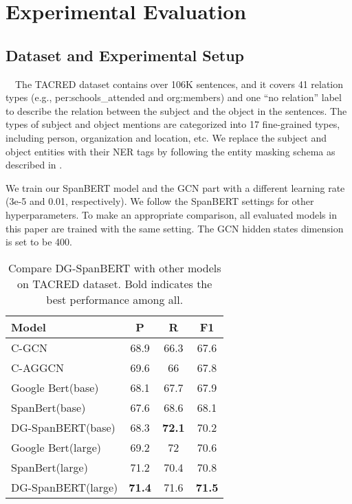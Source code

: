 \documentclass{article}
\begin{document}
\section{Experimental Evaluation}
\subsection{Dataset and Experimental Setup}
\
\
The TACRED dataset \cite{zhang2017position} contains over 106K sentences, and it covers 41 relation types (e.g., per:schools\_attended and org:members) and one ``no relation'' label to describe the relation between the subject and the object in the sentences. The types of subject and object mentions are categorized into 17 fine-grained types, including person, organization and location, etc. We replace the subject and object entities with their NER tags by following the entity masking schema as described in \cite{zhang2017position}.

We train our SpanBERT model and the GCN part with a different learning rate (3e-5 and 0.01, respectively). We follow the SpanBERT settings for other hyperparameters.  To make an appropriate comparison, all evaluated models in this paper are trained with the same setting. The GCN hidden states dimension is set to be 400.

\begin{table}[ht]
	\centering
\begin{tabular}{lccc}
	\hline
    \textbf{Model} & \textbf{P} & \textbf{R} & \textbf{F1}   \\
	\hline
	C-GCN & 68.9& 66.3& 67.6\\
	C-AGGCN & 69.6& 66 & 67.8\\
	\hline
	Google Bert(base) & 68.1 & 67.7 & 67.9 \\
    SpanBert(base) & 67.6  & 68.6 & 68.1\\
    DG-SpanBERT(base) & 68.3 & \textbf{72.1} & 70.2\\
    \hline
    Google Bert(large) &69.2 & 72 & 70.6\\
    SpanBert(large) &71.2& 70.4 & 70.8\\
    
    DG-SpanBERT(large) &\textbf{71.4} &71.6 &\textbf{71.5}\\
   
    \hline
	  \end{tabular}
	\caption{Compare DG-SpanBERT with other models on TACRED dataset.  Bold indicates the best performance among all. } 
    \label{Tab:01}
		 \end{table}
\end{document}
